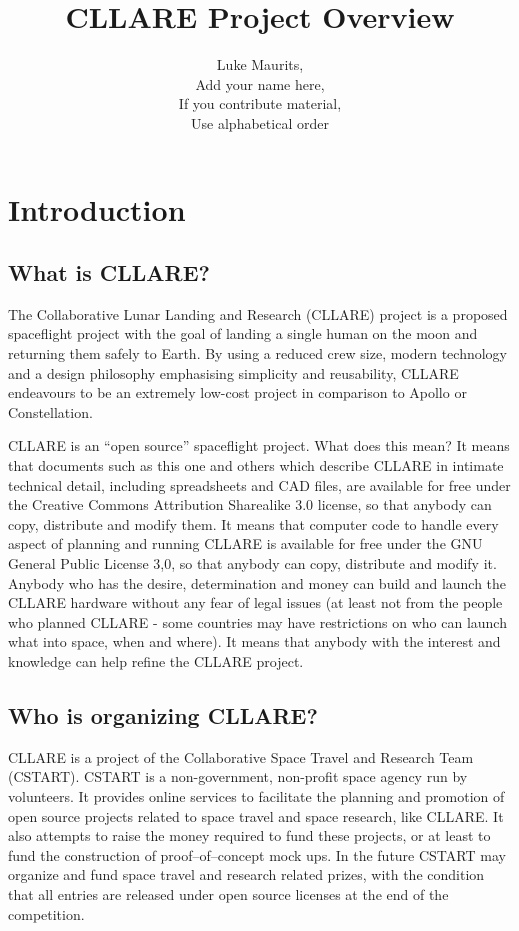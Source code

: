 \documentclass{report}
\author{Luke Maurits, \\
Add your name here, \\
If you contribute material, \\
Use alphabetical order}
\title{CLLARE Project Overview}
\begin{document}
\maketitle
\tableofcontents

\chapter{Introduction}

\section{What is CLLARE?}

The Collaborative Lunar Landing and Research (CLLARE) project is a proposed spaceflight project with the goal of landing a single human on the moon and returning them safely to Earth.  By using a reduced crew size, modern technology and a design philosophy emphasising simplicity and reusability, CLLARE endeavours to be an extremely low-cost project in comparison to Apollo or Constellation.

CLLARE is an ``open source'' spaceflight project.  What does this mean?  It means that documents such as this one and others which describe CLLARE in intimate technical detail, including spreadsheets and CAD files, are available for free under the Creative Commons Attribution Sharealike 3.0 license, so that anybody can copy, distribute and modify them.  It means that computer code to handle every aspect of planning and running CLLARE is available for free under the GNU General Public License 3,0, so that anybody can copy, distribute and modify it.  Anybody who has the desire, determination and money can build and launch the CLLARE hardware without any fear of legal issues (at least not from the people who planned CLLARE - some countries may have restrictions on who can launch what into space, when and where).  It means that anybody with the interest and knowledge can help refine the CLLARE project.

\section{Who is organizing CLLARE?}

CLLARE is a project of the Collaborative Space Travel and Research Team (CSTART).  CSTART is a non-government, non-profit space agency run by volunteers.  It provides online services to facilitate the planning and promotion of open source projects related to space travel and space research, like CLLARE.  It also attempts to raise the money required to fund these projects, or at least to fund the construction of proof--of--concept mock ups.  In the future CSTART may organize and fund space travel and research related prizes, with the condition that all entries are released under open source licenses at the end of the competition.
\end{document}
